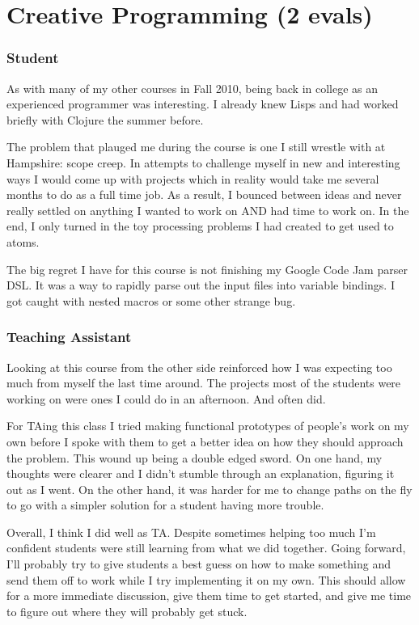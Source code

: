 \section{Creative Programming (2 evals)}

\begin{meta}
\end{meta}

\courseself
\subsubsection*{Student}
As with many of my other courses in Fall 2010, being back in college as
an experienced programmer was interesting. I already knew Lisps and had
worked briefly with Clojure the summer before.

The problem that plauged me during the course is one I still wrestle
with at Hampshire: scope creep. In attempts to challenge myself in new
and interesting ways I would come up with projects which in reality
would take me several months to do as a full time job. As a result, I
bounced between ideas and never really settled on anything I wanted to
work on AND had time to work on. In the end, I only turned in the toy
processing problems I had created to get used to atoms.

The big regret I have for this course is not finishing my Google Code
Jam parser DSL. It was a way to rapidly parse out the input files into
variable bindings. I got caught with nested macros or some other strange
bug.


\subsubsection*{Teaching Assistant}
Looking at this course from the other side reinforced how I was expecting
too much from myself the last time around. The projects most of the
students were working on were ones I could do in an afternoon. And often
did.

For TAing this class I tried making functional prototypes of people's
work on my own before I spoke with them to get a better idea on how they
should approach the problem. This wound up being a double edged sword.
On one hand, my thoughts were clearer and I didn't stumble through an
explanation, figuring it out as I went. On the other hand, it was
harder for me to change paths on the fly to go with a simpler solution
for a student having more trouble.

Overall, I think I did well as TA. Despite sometimes helping too much
I'm confident students were still learning from what we did together.
Going forward, I'll probably try to give students a best guess on how
to make something and send them off to work while I try implementing it
on my own. This should allow for a more immediate discussion, give them
time to get started, and give me time to figure out where they will probably
get stuck.


